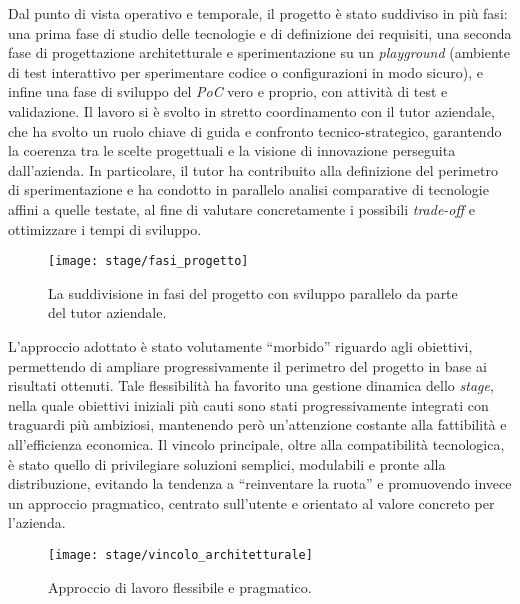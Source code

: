 Dal punto di vista operativo e temporale, il progetto è stato suddiviso in più fasi: una prima fase di studio delle tecnologie e di definizione dei requisiti, 
una seconda fase di progettazione architetturale e sperimentazione su un \emph{playground} (ambiente di test interattivo per sperimentare codice o configurazioni in modo sicuro), e infine una fase di sviluppo del \emph{PoC} vero e proprio, con attività di test e validazione. 
Il lavoro si è svolto in stretto coordinamento con il tutor aziendale, che ha svolto un ruolo chiave di guida e confronto tecnico-strategico, garantendo la coerenza tra 
le scelte progettuali e la visione di innovazione perseguita dall’azienda. 
In particolare, il tutor ha contribuito alla definizione del perimetro di sperimentazione e 
ha condotto in parallelo analisi comparative di tecnologie affini a quelle testate, al fine di valutare concretamente i possibili \emph{trade-off} e ottimizzare i tempi di sviluppo.
\begin{figure}[H]
    \centering
    \texttt{[image: stage/fasi\_progetto]}
    \caption{La suddivisione in fasi del progetto con sviluppo parallelo da parte del tutor aziendale.}
    \label{fig:fasi_progetto}
  \end{figure}
L’approccio adottato è stato volutamente “morbido” riguardo agli obiettivi, permettendo di ampliare progressivamente il perimetro del progetto in base ai risultati ottenuti. 
Tale flessibilità ha favorito una gestione dinamica dello \emph{stage}, nella quale obiettivi iniziali più cauti sono stati progressivamente integrati con traguardi più ambiziosi, 
mantenendo però un’attenzione costante alla fattibilità e all’efficienza economica. 
Il vincolo principale, oltre alla compatibilità tecnologica, è stato quello di privilegiare soluzioni semplici, modulabili e pronte alla distribuzione, evitando la tendenza a “reinventare la ruota” 
e promuovendo invece un approccio pragmatico, centrato sull’utente e orientato al valore concreto per l’azienda.
\begin{figure}[H]
    \centering
    \texttt{[image: stage/vincolo\_architetturale]}
    \caption{Approccio di lavoro flessibile e pragmatico.}
    \label{fig:vincolo_architetturale}
\end{figure}

